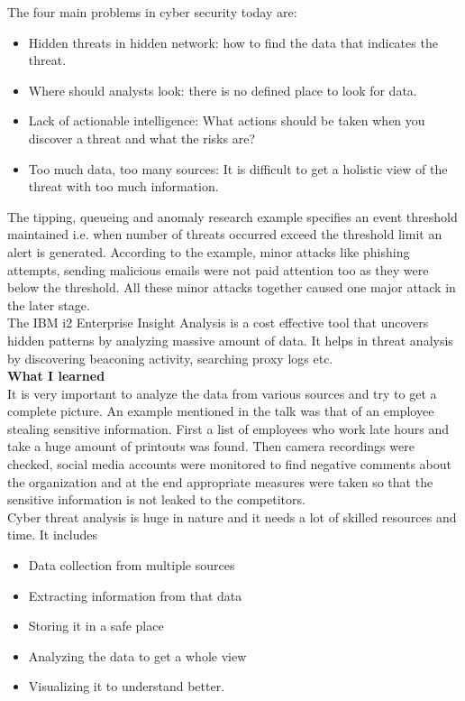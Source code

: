 \documentclass{article}
\begin{document}
The four main problems in cyber security today are:
\begin{itemize}
  \item Hidden threats in hidden network: how to find the data that indicates the threat.
  \item Where should analysts look: there is no defined place to look for data.
  \item Lack of actionable intelligence: What actions should be taken when you discover a threat and what the risks are?
\item Too much data, too many sources: It is difficult to get a holistic view of the threat with too much information.
\end{itemize}

The tipping, queueing and anomaly research example specifies an event threshold maintained i.e. when number of threats occurred exceed the threshold limit an alert is generated. According to the example, minor attacks like phishing attempts, sending malicious emails were not paid attention too as they were below the threshold. All these minor attacks together caused one major attack in the later stage.\\

The IBM i2 Enterprise Insight Analysis is a cost effective tool that uncovers hidden patterns by analyzing massive amount of data. It helps in threat analysis by discovering beaconing activity, searching proxy logs etc. \\

\textbf{What I learned} \\

It is very important to analyze the data from various sources and try to get a complete picture. An example mentioned in the talk was that of an employee stealing sensitive information. First a list of employees who work late hours and take a huge amount of printouts was found. Then camera recordings were checked, social media accounts were monitored to find negative comments about the organization and at the end appropriate measures were taken so that the sensitive information is not leaked to the competitors. \\

Cyber threat analysis is huge in nature and it needs a lot of skilled resources and time. It includes 
\begin{itemize}
 \item Data collection from multiple sources
  \item Extracting information from that data
  \item Storing it in a safe place
  \item Analyzing the data to get a whole view
\item Visualizing it to understand better. 
\end{itemize}
\end{document}
